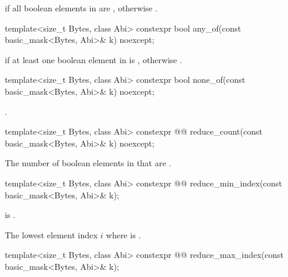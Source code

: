 \begin{itemdescr}
\pnum
\returns
{} if all boolean elements in  are , otherwise
.
\end{itemdescr}

\begin{itemdecl}
template<size_t Bytes, class Abi>
  constexpr bool any_of(const basic_mask<Bytes, Abi>& k) noexcept;
\end{itemdecl}

\begin{itemdescr}
\pnum
\returns
{} if at least one boolean element in  is ,
otherwise .
\end{itemdescr}

\begin{itemdecl}
template<size_t Bytes, class Abi>
  constexpr bool none_of(const basic_mask<Bytes, Abi>& k) noexcept;
\end{itemdecl}

\begin{itemdescr}
\pnum
\returns
{}.
\end{itemdescr}

\begin{itemdecl}
template<size_t Bytes, class Abi>
  constexpr @@ reduce_count(const basic_mask<Bytes, Abi>& k) noexcept;
\end{itemdecl}

\begin{itemdescr}
\pnum
\returns
The number of boolean elements in  that are .
\end{itemdescr}

\begin{itemdecl}
template<size_t Bytes, class Abi>
  constexpr @@ reduce_min_index(const basic_mask<Bytes, Abi>& k);
\end{itemdecl}

\begin{itemdescr}
\pnum
\expects
{} is .

\pnum
\returns
The lowest element index $i$ where  is .
\end{itemdescr}

\begin{itemdecl}
template<size_t Bytes, class Abi>
  constexpr @@ reduce_max_index(const basic_mask<Bytes, Abi>& k);
\end{itemdecl}

